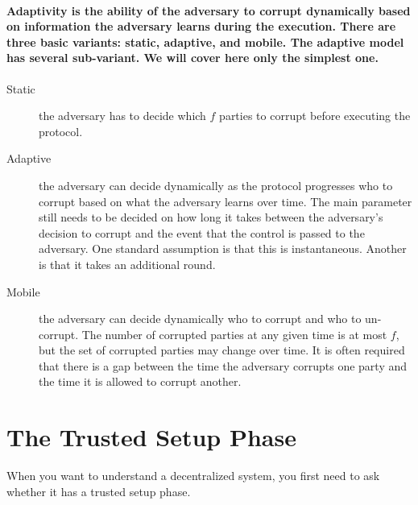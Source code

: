 \paragraph{Adaptivity is the ability of the adversary to corrupt dynamically
based on information the adversary learns during the execution. There
are three basic variants: static, adaptive, and mobile. The adaptive
model has several sub-variant. We will cover here only the simplest
one.}
\begin{description}
\item [{Static}] the adversary has to decide which $f$ parties to corrupt
before executing the protocol.
\item [{Adaptive}] the adversary can decide dynamically as the protocol
progresses who to corrupt based on what the adversary learns over
time. The main parameter still needs to be decided on how long
it takes between the adversary's decision to corrupt and the event that
the control is passed to the adversary. One standard assumption is
that this is instantaneous. Another is that it takes an additional
round.
\item [{Mobile}] the adversary can decide dynamically who to corrupt and
who to un-corrupt. The number of corrupted parties at any given
time is at most $f$, but the set of corrupted parties
may change over time. It is often required that there is a gap between the time
the adversary corrupts one party and the time it is allowed to corrupt
another.
\end{description}
%

\section{The Trusted Setup Phase }

When you want to understand a decentralized system, you first need to ask whether it has a trusted setup phase.

